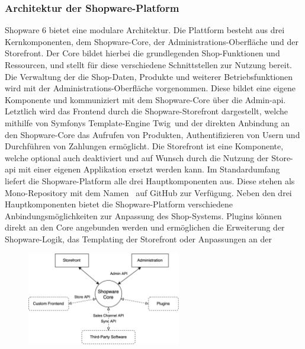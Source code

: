 \subsubsection{Architektur der Shopware-Platform}

Shopware 6 bietet eine modulare Architektur.
Die Plattform besteht aus drei Kernkomponenten, dem Shopware-Core, der Administrations-Oberfläche und der Storefront.
Der Core bildet hierbei die grundlegenden Shop-Funktionen und Ressourcen, und stellt für diese verschiedene
Schnittstellen zur Nutzung bereit.
Die Verwaltung der die Shop-Daten, Produkte und weiterer Betriebsfunktionen wird mit der Administrations-Oberfläche
vorgenommen.
Diese bildet eine eigene Komponente und kommuniziert mit dem Shopware-Core über die Admin-\acrshort{api}.
Letztlich wird das Frontend durch die Shopware-Storefront dargestellt, welche mithilfe von Symfonys Template-Engine
\glqq Twig\grqq\ und der direkten Anbindung an den Shopware-Core das Aufrufen von Produkten, Authentifizieren von Usern
und Durchführen von Zahlungen ermöglicht.
Die Storefront ist eine Komponente, welche optional auch deaktiviert und auf Wunsch durch die
Nutzung der Store-\acrshort{api} mit einer eigenen Applikation ersetzt werden kann.
Im Standardumfang liefert die Shopware-Platform alle drei Hauptkomponenten aus.
Diese stehen als Mono-Repository mit dem Namen\  auf GitHub zur Verfügung.
Neben den drei Hauptkomponenten bietet die Shopware-Platform verschiedene Anbindungsmöglichkeiten zur Anpassung des
Shop-Systems.
Plugins können direkt an den Core angebunden werden und ermöglichen die Erweiterung der Shopware-Logik, das Templating
der Storefront oder Anpassungen an der
\begin{figure}
    \centering
    \includegraphics[width=0.60\textwidth]{images/content/shopware-architecture}
    \label{fig:shopware-architecture}
\end{figure}\!\!\!
